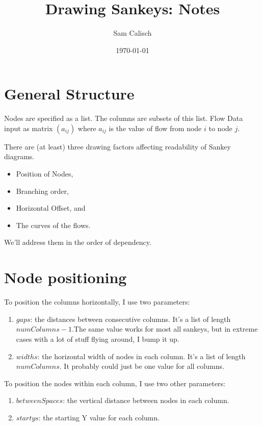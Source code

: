 \documentclass[11pt]{article}
\begin{document}
\title{Drawing Sankeys: Notes}
\author{Sam Calisch}
\date{\today}
\maketitle



\section{General Structure}
Nodes are specified as a list.  The columns are subsets of this list.  Flow Data input as matrix $\left( a_{ij} \right)$ where $a_{ij}$ is the value of flow from node $i$ to node $j$.

There are (at least) three drawing factors affecting readability of Sankey diagrams.
\begin{itemize}
\item Position of Nodes,
\item Branching order, 
\item Horizontal Offset, and 
\item The curves of the flows.
\end{itemize}

We'll address them in the order of dependency.


\section{Node positioning}

To position the columns horizontally, I use two parameters:
\begin{enumerate}
\item $gaps$: the distances between consecutive columns.  It's a list of length $numColumns - 1$.The same value works for most all sankeys, but in extreme cases with a lot of stuff flying around, I bump it up.
\item $widths$: the horizontal width of nodes in each column.  It's a list of length $numColumns$.  It probably could just be one value for all columns.
\end{enumerate}

To position the nodes within each column, I use two other parameters:
\begin{enumerate}
\item $betweenSpaces$: the vertical distance between nodes in each column.
\item $startys$: the starting Y value for each column.
\end{enumerate}
\end{document}
